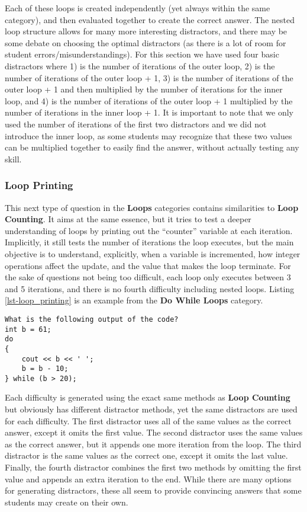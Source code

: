 \documentclass{article}
\begin{document}
Each of these loops is created independently (yet always within the same category), and then evaluated together to create the correct answer. The nested loop structure allows for many more
interesting distractors, and there may be some debate on choosing the optimal distractors (as there is a lot of room for student errors/misunderstandings). For this section we have used four
basic distractors where 1)  is the number of iterations of the outer loop, 2) is the number of iterations of the outer loop + 1, 3) is the number of iterations of the outer loop + 1 and then 
multiplied by the number of iterations for the inner loop, and 4) is the number of iterations of the outer loop + 1 multiplied by the number of iterations in the inner loop + 1. It is important to 
note that we only used the number of iterations of the first two distractors and we did not introduce the inner loop, as some students may recognize that these two values can be multiplied 
together to easily find the answer, without actually testing any skill.

\subsubsection{Loop Printing} \label{subsubsec-loop_printing}

This next type of question in the \textbf{Loops} categories contains similarities to \textbf{Loop Counting}. It aims at the same essence, but it tries to test a deeper understanding of loops by printing out the 
``counter'' variable at each iteration. Implicitly, it still tests the number of iterations the loop executes, but the main objective is to understand, explicitly, when a variable is incremented,
how integer operations affect the update, and the value that makes the loop terminate. For the sake of questions not being too difficult, each loop only executes between 3 and 5 iterations, and there is no fourth difficulty including nested loops. Listing \ref{lst-loop_printing} is an example from the \textbf{Do While Loops} category.

\begin{lstlisting}[caption={Loop Printing Difficulty 2 Example}, label=lst-loop_printing]
What is the following output of the code? 
int b = 61; 
do
{ 
	cout << b << ' '; 
	b = b - 10; 
} while (b > 20); 
\end{lstlisting}


Each difficulty is generated using the exact same methods as \textbf{Loop Counting} but obviously has different distractor methods, yet the same distractors are used for each difficulty. The first 
distractor uses all of the same values as the correct answer, except it omits the first value. The second distractor uses the same values as the correct answer, but it appends one more iteration
from the loop. The third distractor is the same values as the correct one, except it omits the last value. Finally, the fourth distractor combines the first two methods by omitting the first value
and appends an extra iteration to the end. While there are many options for generating distractors, these all seem to provide convincing answers that some students may create on their own.
\end{document}
